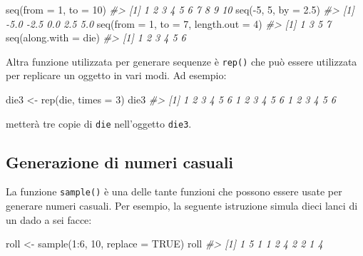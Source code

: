 \documentclass[
]{memoir}
\newenvironment{Shaded}{\begin{snugshade}}{\end{snugshade}}
\newcommand{\AttributeTok}[1]{\textcolor[rgb]{0.77,0.63,0.00}{#1}}
\newcommand{\CommentTok}[1]{\textcolor[rgb]{0.56,0.35,0.01}{\textit{#1}}}
\newcommand{\ConstantTok}[1]{\textcolor[rgb]{0.00,0.00,0.00}{#1}}
\newcommand{\DecValTok}[1]{\textcolor[rgb]{0.00,0.00,0.81}{#1}}
\newcommand{\FloatTok}[1]{\textcolor[rgb]{0.00,0.00,0.81}{#1}}
\newcommand{\FunctionTok}[1]{\textcolor[rgb]{0.00,0.00,0.00}{#1}}
\newcommand{\NormalTok}[1]{#1}
\newcommand{\OtherTok}[1]{\textcolor[rgb]{0.56,0.35,0.01}{#1}}
\newcommand{\SpecialCharTok}[1]{\textcolor[rgb]{0.00,0.00,0.00}{#1}}
\theoremstyle{definition}
\theoremstyle{definition}
\theoremstyle{definition}
\theoremstyle{definition}
\theoremstyle{remark}
\begin{document}
\begin{Shaded}
\begin{Highlighting}[]
\FunctionTok{seq}\NormalTok{(}\AttributeTok{from =} \DecValTok{1}\NormalTok{, }\AttributeTok{to =} \DecValTok{10}\NormalTok{)}
\CommentTok{\#\textgreater{}  [1]  1  2  3  4  5  6  7  8  9 10}
\FunctionTok{seq}\NormalTok{(}\SpecialCharTok{{-}}\DecValTok{5}\NormalTok{, }\DecValTok{5}\NormalTok{, }\AttributeTok{by =} \FloatTok{2.5}\NormalTok{)}
\CommentTok{\#\textgreater{} [1] {-}5.0 {-}2.5  0.0  2.5  5.0}
\FunctionTok{seq}\NormalTok{(}\AttributeTok{from =} \DecValTok{1}\NormalTok{, }\AttributeTok{to =} \DecValTok{7}\NormalTok{, }\AttributeTok{length.out =} \DecValTok{4}\NormalTok{)}
\CommentTok{\#\textgreater{} [1] 1 3 5 7}
\FunctionTok{seq}\NormalTok{(}\AttributeTok{along.with =}\NormalTok{ die)}
\CommentTok{\#\textgreater{} [1] 1 2 3 4 5 6}
\end{Highlighting}
\end{Shaded}

Altra funzione utilizzata per generare sequenze è \texttt{rep()} che può essere
utilizzata per replicare un oggetto in vari modi. Ad esempio:

\begin{Shaded}
\begin{Highlighting}[]
\NormalTok{die3 }\OtherTok{\textless{}{-}} \FunctionTok{rep}\NormalTok{(die, }\AttributeTok{times =} \DecValTok{3}\NormalTok{)}
\NormalTok{die3}
\CommentTok{\#\textgreater{}  [1] 1 2 3 4 5 6 1 2 3 4 5 6 1 2 3 4 5 6}
\end{Highlighting}
\end{Shaded}

metterà tre copie di \texttt{die} nell'oggetto \texttt{die3}.

\hypertarget{generazione-di-numeri-casuali}{%
\subsection{Generazione di numeri casuali}\label{generazione-di-numeri-casuali}}

La funzione \texttt{sample()} è una delle tante funzioni che possono essere
usate per generare numeri casuali. Per esempio, la seguente istruzione
simula dieci lanci di un dado a sei facce:

\begin{Shaded}
\begin{Highlighting}[]
\NormalTok{roll }\OtherTok{\textless{}{-}} \FunctionTok{sample}\NormalTok{(}\DecValTok{1}\SpecialCharTok{:}\DecValTok{6}\NormalTok{, }\DecValTok{10}\NormalTok{, }\AttributeTok{replace =} \ConstantTok{TRUE}\NormalTok{)}
\NormalTok{roll}
\CommentTok{\#\textgreater{}  [1] 1 5 1 1 2 4 2 2 1 4}
\end{Highlighting}
\end{Shaded}
\end{document}
